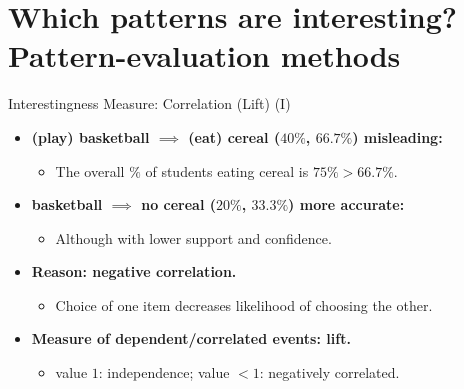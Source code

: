\section{Which patterns are interesting? Pattern-evaluation methods}

\begin{frame}{Interestingness Measure: Correlation (Lift) (I)}
	\begin{itemize}
		\item \textbf{(play) basketball $\implies$ (eat) cereal 
			($40\%$, $66.7\%$)  misleading:}
		\begin{itemize}
			\item The overall $\%$ of students eating cereal is $75\% > 
			66.7\%$.
		\end{itemize}
		\item \textbf{basketball $\implies$ no cereal ($20\%$, 
			$33.3\%$)  more accurate:}
		\begin{itemize}
			\item Although with lower support and confidence.
		\end{itemize}
		\item \textbf{Reason: negative correlation.}
		\begin{itemize}
			\item Choice of one item decreases likelihood of choosing 
			the other.
		\end{itemize}
		\item \textbf{Measure of dependent/correlated events: lift.}
		\begin{itemize}
			\item value $1$: independence; value $< 1$: negatively 
			correlated.
		\end{itemize}
	\end{itemize}
\end{frame}

